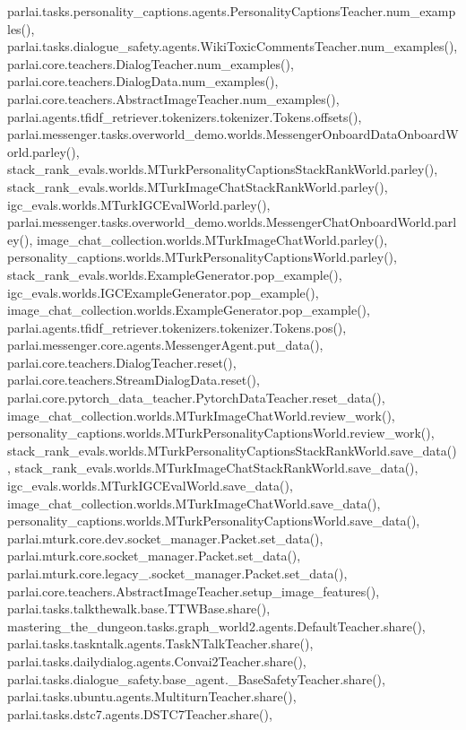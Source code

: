 parlai.\+tasks.\+personality\+\_\+captions.\+agents.\+Personality\+Captions\+Teacher.\+num\+\_\+examples(), parlai.\+tasks.\+dialogue\+\_\+safety.\+agents.\+Wiki\+Toxic\+Comments\+Teacher.\+num\+\_\+examples(), parlai.\+core.\+teachers.\+Dialog\+Teacher.\+num\+\_\+examples(), parlai.\+core.\+teachers.\+Dialog\+Data.\+num\+\_\+examples(), parlai.\+core.\+teachers.\+Abstract\+Image\+Teacher.\+num\+\_\+examples(), parlai.\+agents.\+tfidf\+\_\+retriever.\+tokenizers.\+tokenizer.\+Tokens.\+offsets(), parlai.\+messenger.\+tasks.\+overworld\+\_\+demo.\+worlds.\+Messenger\+Onboard\+Data\+Onboard\+World.\+parley(), stack\+\_\+rank\+\_\+evals.\+worlds.\+M\+Turk\+Personality\+Captions\+Stack\+Rank\+World.\+parley(), stack\+\_\+rank\+\_\+evals.\+worlds.\+M\+Turk\+Image\+Chat\+Stack\+Rank\+World.\+parley(), igc\+\_\+evals.\+worlds.\+M\+Turk\+I\+G\+C\+Eval\+World.\+parley(), parlai.\+messenger.\+tasks.\+overworld\+\_\+demo.\+worlds.\+Messenger\+Chat\+Onboard\+World.\+parley(), image\+\_\+chat\+\_\+collection.\+worlds.\+M\+Turk\+Image\+Chat\+World.\+parley(), personality\+\_\+captions.\+worlds.\+M\+Turk\+Personality\+Captions\+World.\+parley(), stack\+\_\+rank\+\_\+evals.\+worlds.\+Example\+Generator.\+pop\+\_\+example(), igc\+\_\+evals.\+worlds.\+I\+G\+C\+Example\+Generator.\+pop\+\_\+example(), image\+\_\+chat\+\_\+collection.\+worlds.\+Example\+Generator.\+pop\+\_\+example(), parlai.\+agents.\+tfidf\+\_\+retriever.\+tokenizers.\+tokenizer.\+Tokens.\+pos(), parlai.\+messenger.\+core.\+agents.\+Messenger\+Agent.\+put\+\_\+data(), parlai.\+core.\+teachers.\+Dialog\+Teacher.\+reset(), parlai.\+core.\+teachers.\+Stream\+Dialog\+Data.\+reset(), parlai.\+core.\+pytorch\+\_\+data\+\_\+teacher.\+Pytorch\+Data\+Teacher.\+reset\+\_\+data(), image\+\_\+chat\+\_\+collection.\+worlds.\+M\+Turk\+Image\+Chat\+World.\+review\+\_\+work(), personality\+\_\+captions.\+worlds.\+M\+Turk\+Personality\+Captions\+World.\+review\+\_\+work(), stack\+\_\+rank\+\_\+evals.\+worlds.\+M\+Turk\+Personality\+Captions\+Stack\+Rank\+World.\+save\+\_\+data(), stack\+\_\+rank\+\_\+evals.\+worlds.\+M\+Turk\+Image\+Chat\+Stack\+Rank\+World.\+save\+\_\+data(), igc\+\_\+evals.\+worlds.\+M\+Turk\+I\+G\+C\+Eval\+World.\+save\+\_\+data(), image\+\_\+chat\+\_\+collection.\+worlds.\+M\+Turk\+Image\+Chat\+World.\+save\+\_\+data(), personality\+\_\+captions.\+worlds.\+M\+Turk\+Personality\+Captions\+World.\+save\+\_\+data(), parlai.\+mturk.\+core.\+dev.\+socket\+\_\+manager.\+Packet.\+set\+\_\+data(), parlai.\+mturk.\+core.\+socket\+\_\+manager.\+Packet.\+set\+\_\+data(), parlai.\+mturk.\+core.\+legacy\+\_.\+socket\+\_\+manager.\+Packet.\+set\+\_\+data(), parlai.\+core.\+teachers.\+Abstract\+Image\+Teacher.\+setup\+\_\+image\+\_\+features(), parlai.\+tasks.\+talkthewalk.\+base.\+T\+T\+W\+Base.\+share(), mastering\+\_\+the\+\_\+dungeon.\+tasks.\+graph\+\_\+world2.\+agents.\+Default\+Teacher.\+share(), parlai.\+tasks.\+taskntalk.\+agents.\+Task\+N\+Talk\+Teacher.\+share(), parlai.\+tasks.\+dailydialog.\+agents.\+Convai2\+Teacher.\+share(), parlai.\+tasks.\+dialogue\+\_\+safety.\+base\+\_\+agent.\+\_\+\+Base\+Safety\+Teacher.\+share(), parlai.\+tasks.\+ubuntu.\+agents.\+Multiturn\+Teacher.\+share(), parlai.\+tasks.\+dstc7.\+agents.\+D\+S\+T\+C7\+Teacher.\+share(), 